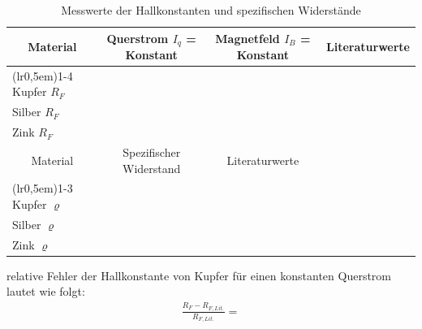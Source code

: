 \begin{table}[H]
\centering
    \begin{tabular}{l r r r}
    \toprule
        \multicolumn{1}{c}{Material} & \multicolumn{1}{c}{Querstrom $I_q$ = Konstant} & 
        \multicolumn{1}{c}{Magnetfeld $I_B$ = Konstant} & \multicolumn{1}{c}{Literaturwerte}\\
    \cmidrule(lr{0,5em}){1-4}
        Kupfer $R_F$ & \text{} & \text{} & \text{} \\
        Silber $R_F$ & \text{} & \text{} & \text{} \\
        Zink $R_F$   & \text{} & \text{} & \text{} \\
    \toprule
        \multicolumn{1}{c}{Material} & \multicolumn{1}{c}{Spezifischer Widerstand} & 
        \multicolumn{1}{c}{Literaturwerte} & \multicolumn{1}{c}{}\\
    \cmidrule(lr{0,5em}){1-3}
        Kupfer $\varrho$ & \text{} & \text{} & \\
        Silber $\varrho$ & \text{} & \text{} & \\
        Zink $\varrho$   & \text{} &                                & \\
    \bottomrule
    \end{tabular}
\caption{Messwerte der Hallkonstanten und spezifischen Widerstände}
\label{tab:11}
\end{table}





\justifying relative Fehler der Hallkonstante von Kupfer für einen konstanten Querstrom lautet wie folgt:
\begin{align}
    \frac{R_F - R_{F,Lit.}}{R_{F,Lit.}} = \text{}
\end{align}

